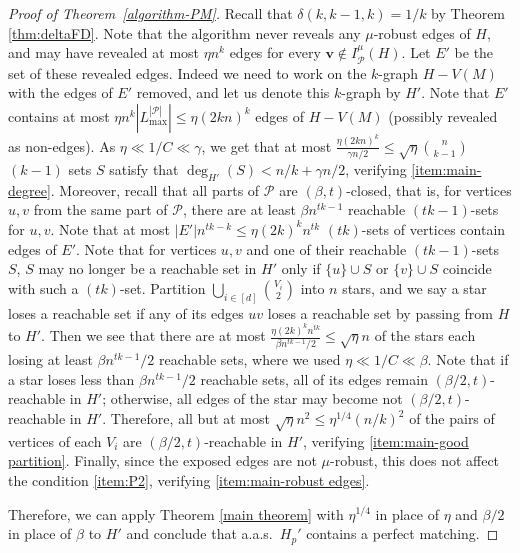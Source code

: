 \documentclass[11pt, letterpaper]{amsart}
\theoremstyle{plain}
\numberwithin{equation}{section}
\theoremstyle{definition}
\newcommand\card[1]{\left| #1 \right|}
\renewcommand{\vec}[1]{{\mathbf #1}}
\begin{document}
\begin{proof}[Proof of Theorem~\ref{algorithm-PM}]
{Recall that $\delta(k,k-1,k)=1/k$ by Theorem \ref{thm:deltaFD}.}
Note that the algorithm never reveals any $\mu$-robust edges of $H$, and may have revealed at most $\eta n^k$ edges for every \(\vec{v}\notin I_{\mathcal P}^{\mu}(H)\).
Let $E'$ be the set of these revealed edges.
Indeed we need to work on the $k$-graph $H-V(M)$ with the edges of $E'$ removed, and let us denote this $k$-graph by $H'$.
Note that $E'$ contains at most $\eta n^k |L_{\max}^{\card{\mathcal{P}}}|\le \eta (2kn)^k $ edges of $H-V(M)$ (possibly revealed as non-edges).
As $\eta \ll 1/C\ll \gamma$, we get that at most $\frac{\eta (2kn)^k}{\gamma n/2}\le \sqrt\eta \binom n{k-1}$ $(k-1)$ sets $S$ satisfy that $\deg_{H'}(S)< n/k+\gamma n/2$, verifying \ref{item:main-degree}.
Moreover, recall that all parts of $\mathcal P$ are $(\beta, t)$-closed, that is, for vertices $u, v$ from the same part of $\mathcal P$, there are at least $\beta n^{tk-1}$ reachable $(tk-1)$-sets for $u,v$.
Note that at most $|E'|n^{tk-k}\le \eta (2k)^k n^{tk}$ $(tk)$-sets of vertices contain edges of $E'$.
Note that for vertices $u, v$ and one of their reachable $(tk-1)$-sets $S$, $S$ may no longer be a reachable set in $H'$ only if $\{u\}\cup S$ or $\{v\}\cup S$ coincide with such a $(tk)$-set.
Partition $\bigcup_{i\in [d]}\binom{V_i}{2}$ into $n$ stars, and we say a star loses a reachable set if any of its edges $uv$ loses a reachable set by passing from $H$ to $H'$.
Then we see that there are at most $\frac{\eta (2k)^kn^{tk}}{\beta n^{tk-1}/2}\le \sqrt{\eta}n$ of the stars each losing at least $\beta n^{tk-1}/2$ reachable sets, where we used $\eta \ll 1/C\ll \beta$.
Note that if a star loses less than $\beta n^{tk-1}/2$ reachable sets, all of its edges remain $(\beta/2,t)$-reachable in $H'$; otherwise, all edges of the star may become not $(\beta/2,t)$-reachable in $H'$.
Therefore, all but at most $\sqrt{\eta}n^2\le \eta^{1/4}(n/k)^2$ of the pairs of vertices of each $V_i$ are $(\beta/2,t)$-reachable in $H'$, verifying \ref{item:main-good partition}.
Finally, since the exposed edges are not $\mu$-robust, this does not affect the condition \ref{item:P2}, verifying \ref{item:main-robust edges}. 

Therefore, we can apply Theorem \ref{main theorem} with $\eta^{1/4}$ in place of $\eta$ and $\beta/2$ in place of $\beta$ to $H'$ and conclude that a.a.s.~$H_p'$ contains a perfect matching. 


\end{proof}
\end{document}
